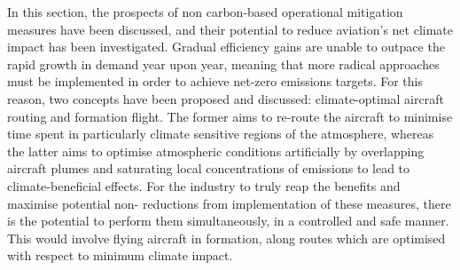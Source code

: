 In this section, the prospects of non carbon-based operational mitigation measures have been discussed, and their potential to reduce aviation's net climate impact has been investigated. Gradual efficiency gains are unable to outpace the rapid growth in demand year upon year, meaning that more radical approaches must be implemented in order to achieve net-zero emissions targets. For this reason, two concepts have been proposed and discussed: climate-optimal aircraft routing and formation flight. The former aims to re-route the aircraft to minimise time spent in particularly climate sensitive regions of the atmosphere, whereas the latter aims to optimise atmospheric conditions artificially by overlapping aircraft plumes and saturating local concentrations of emissions to lead to climate-beneficial effects. For the industry to truly reap the benefits and maximise potential non- reductions from implementation of these measures, there is the potential to perform them simultaneously, in a controlled and safe manner. This would involve flying aircraft in formation, along routes which are optimised with respect to minimum climate impact.  







